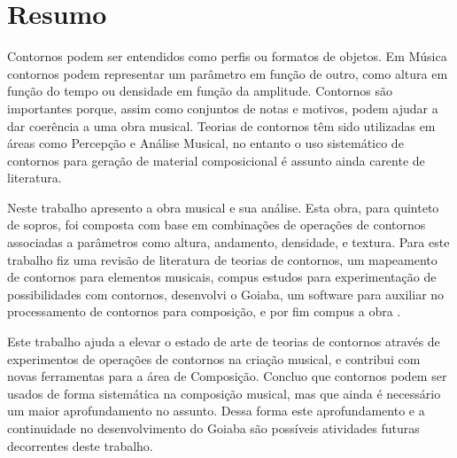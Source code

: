 \chapter*{Resumo}
\label{cha:resumo}

Contornos podem ser entendidos como perfis ou formatos de objetos. Em
Música contornos podem representar um parâmetro em função de outro,
como altura em função do tempo ou densidade em função da
amplitude. Contornos são importantes porque, assim como conjuntos de
notas e motivos, podem ajudar a dar coerência a uma obra musical.
Teorias de contornos têm sido utilizadas em áreas como Percepção e
Análise Musical, no entanto o uso sistemático de contornos para
geração de material composicional é assunto ainda carente de
literatura.

Neste trabalho apresento a obra musical \obra{} e sua análise. Esta
obra, para quinteto de sopros, foi composta com base em combinações de
operações de contornos associadas a parâmetros como altura, andamento,
densidade, e textura.
Para este trabalho fiz uma revisão de literatura de teorias de
contornos, um mapeamento de contornos para elementos musicais, compus
estudos para experimentação de possibilidades com contornos,
desenvolvi o Goiaba, um software para auxiliar no processamento de
contornos para composição, e por fim compus a obra \obra{}.

Este trabalho ajuda a elevar o estado de arte de teorias de contornos
através de experimentos de operações de contornos na criação musical,
e contribui com novas ferramentas para a área de Composição.
Concluo que contornos podem ser usados de forma sistemática na
composição musical, mas que ainda é necessário um maior aprofundamento
no assunto. Dessa forma este aprofundamento e a continuidade no
desenvolvimento do Goiaba são possíveis atividades futuras decorrentes
deste trabalho.
